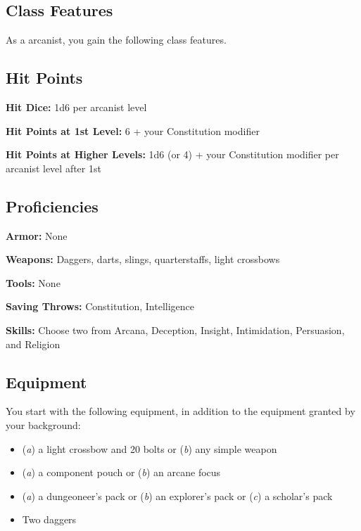 \subsection{Class Features}

As a arcanist, you gain the following class features.

\subsection{Hit Points}

\textbf{Hit Dice:} 1d6 per arcanist level

\textbf{Hit Points at 1st Level:} 6 + your Constitution modifier

\textbf{Hit Points at Higher Levels:} 1d6 (or 4) + your Constitution modifier per arcanist level after 1st

\subsection{Proficiencies}

\textbf{Armor:} None

\textbf{Weapons:} Daggers, darts, slings, quarterstaffs, light crossbows

\textbf{Tools:} None

\textbf{Saving Throws:} Constitution, Intelligence

\textbf{Skills:} Choose two from Arcana, Deception, Insight, Intimidation, Persuasion, and Religion

\subsection{Equipment}

You start with the following equipment, in addition to the equipment granted by your background:
\begin{itemize}
\item (\textit{a}) a light crossbow and 20 bolts or (\textit{b}) any simple weapon
\item (\textit{a}) a component pouch or (\textit{b}) an arcane focus
\item (\textit{a}) a dungeoneer's pack or (\textit{b}) an explorer's pack or (\textit{c}) a scholar's pack
\item Two daggers
\end{itemize}

